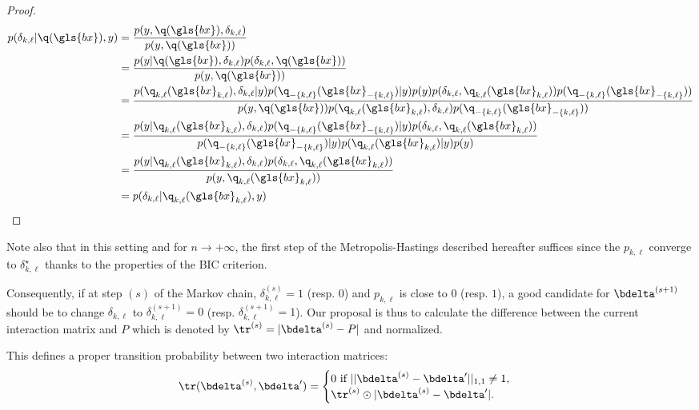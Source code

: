 \begin{proof}
\begin{align*}
p(\delta_{k,\ell} | \q(\gls{bx}),y) & = \frac{p(y , \q(\gls{bx}), \delta_{k,\ell})}{p(y , \q(\gls{bx}))} \\
 & = \frac{p(y | \q(\gls{bx}),\delta_{k,\ell}) p(\delta_{k,\ell}, \q(\gls{bx}))}{p(y,\q(\gls{bx}))} \\
 & = \frac{p(\q_{k,\ell}(\gls{bx}_{k,\ell}),\delta_{k,\ell} | y) p(\q_{-\{k,\ell\}}(\gls{bx}_{-\{k,\ell\}}) | y) p(y) p(\delta_{k,\ell},\q_{k,\ell}(\gls{bx}_{k,\ell})) p(\q_{-\{k,\ell\}}(\gls{bx}_{-\{k,\ell\}})) }{p(y,\q(\gls{bx})) p(\q_{k,\ell}(\gls{bx}_{k,\ell}),\delta_{k,\ell}) p(\q_{-\{k,\ell\}}(\gls{bx}_{-\{k,\ell\}}))} \\
 & = \frac{p(y | \q_{k,\ell}(\gls{bx}_{k,\ell}),\delta_{k,\ell}) p(\q_{-\{k,\ell\}}(\gls{bx}_{-\{k,\ell\}}) | y) p(\delta_{k,\ell},\q_{k,\ell}(\gls{bx}_{k,\ell}))}{p(\q_{-\{k,\ell\}}(\gls{bx}_{-\{k,\ell\}}) | y) p(\q_{k,\ell}(\gls{bx}_{k,\ell}) | y) p(y) } \\
 & = \frac{p(y | \q_{k,\ell}(\gls{bx}_{k,\ell}),\delta_{k,\ell}) p(\delta_{k,\ell},\q_{k,\ell}(\gls{bx}_{k,\ell}))}{p(y , \q_{k,\ell}(\gls{bx}_{k,\ell}))} \\
 & = p(\delta_{k,\ell} | \q_{k,\ell}(\gls{bx}_{k,\ell}), y)
\end{align*}
\end{proof}
Note also that in this setting and for $n \to +\infty$, the first step of the Metropolis-Hastings described hereafter suffices since the $p_{k,\ell}$ converge to $\delta_{k,\ell}^\star$ thanks to the properties of the BIC criterion.

Consequently, if at step $(s)$ of the Markov chain, $\delta_{k,\ell}^{(s)} = 1$ (resp. $0$) and $p_{k,\ell}$ is close to $0$ (resp. $1$), a good candidate for $\bdelta^{(s+1)}$ should be to change $\delta_{k,\ell}$ to $\delta_{k,\ell}^{(s+1)} = 0$ (resp. $\delta_{k,\ell}^{(s+1)} = 1$). Our proposal is thus to calculate the difference between the current interaction matrix and $P$ which is denoted by $\tr^{(s)} = |\bdelta^{(s)} - P|$ and normalized.

This defines a proper transition probability between two interaction matrices:
\[ \tr(\bdelta^{(s)},\bdelta') = \begin{cases} 0 \text{ if } ||\bdelta^{(s)} - \bdelta'||_{1,1} \neq 1, \\ \tr^{(s)} \odot |\bdelta^{(s)} - \bdelta'|. \end{cases} \]

